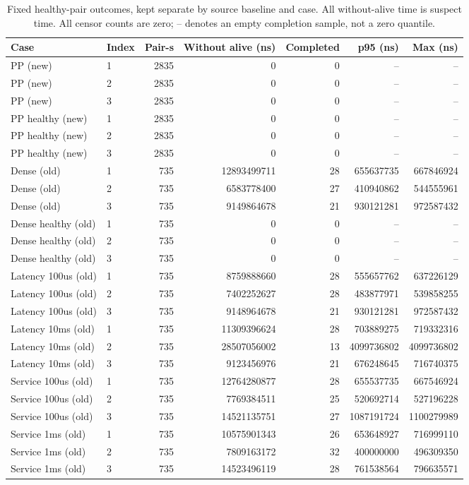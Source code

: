 \begin{table}[ht]\centering\footnotesize
\setlength{\tabcolsep}{3pt}
\begin{tabular}{llrrrrr}\toprule
Case & Index & Pair-s & Without alive (ns) & Completed & p95 (ns) & Max (ns) \\ \midrule
PP (new) & 1 & 2835 & 0 & 0 & -- & -- \\
PP (new) & 2 & 2835 & 0 & 0 & -- & -- \\
PP (new) & 3 & 2835 & 0 & 0 & -- & -- \\
PP healthy (new) & 1 & 2835 & 0 & 0 & -- & -- \\
PP healthy (new) & 2 & 2835 & 0 & 0 & -- & -- \\
PP healthy (new) & 3 & 2835 & 0 & 0 & -- & -- \\
Dense (old) & 1 & 735 & 12893499711 & 28 & 655637735 & 667846924 \\
Dense (old) & 2 & 735 & 6583778400 & 27 & 410940862 & 544555961 \\
Dense (old) & 3 & 735 & 9149864678 & 21 & 930121281 & 972587432 \\
Dense healthy (old) & 1 & 735 & 0 & 0 & -- & -- \\
Dense healthy (old) & 2 & 735 & 0 & 0 & -- & -- \\
Dense healthy (old) & 3 & 735 & 0 & 0 & -- & -- \\
Latency 100us (old) & 1 & 735 & 8759888660 & 28 & 555657762 & 637226129 \\
Latency 100us (old) & 2 & 735 & 7402252627 & 28 & 483877971 & 539858255 \\
Latency 100us (old) & 3 & 735 & 9148964678 & 21 & 930121281 & 972587432 \\
Latency 10ms (old) & 1 & 735 & 11309396624 & 28 & 703889275 & 719332316 \\
Latency 10ms (old) & 2 & 735 & 28507056002 & 13 & 4099736802 & 4099736802 \\
Latency 10ms (old) & 3 & 735 & 9123456976 & 21 & 676248645 & 716740375 \\
Service 100us (old) & 1 & 735 & 12764280877 & 28 & 655537735 & 667546924 \\
Service 100us (old) & 2 & 735 & 7769384511 & 25 & 520692714 & 527196228 \\
Service 100us (old) & 3 & 735 & 14521135751 & 27 & 1087191724 & 1100279989 \\
Service 1ms (old) & 1 & 735 & 10575901343 & 26 & 653648927 & 716999110 \\
Service 1ms (old) & 2 & 735 & 7809163172 & 32 & 400000000 & 496309350 \\
Service 1ms (old) & 3 & 735 & 14523496119 & 28 & 761538564 & 796635571 \\
\bottomrule\end{tabular}
\caption{Fixed healthy-pair outcomes, kept separate by source baseline and case. All without-alive time is suspect time. All censor counts are zero; -- denotes an empty completion sample, not a zero quantile.}
\end{table}
